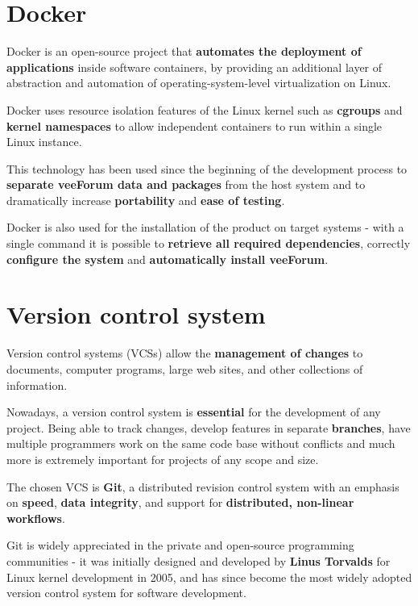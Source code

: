 \documentclass[12pt]{report}
\renewcommand\emph{\textbf}
\begin{document}
            \section{Docker}
                Docker is an open-source project that \emph{automates the deployment of applications} inside software containers, by providing an additional layer of abstraction and automation of operating-system-level virtualization on Linux.

                Docker uses resource isolation features of the Linux kernel such as \emph{cgroups} and \emph{kernel namespaces} to allow independent containers to run within a single Linux instance.

                This technology has been used since the beginning of the development process to \emph{separate veeForum data and packages} from the host system and to dramatically increase \emph{portability} and \emph{ease of testing}.

                Docker is also used for the installation of the product on target systems - with a single command it is possible to \emph{retrieve all required dependencies}, correctly \emph{configure the system} and \emph{automatically install veeForum}.

            \section{Version control system}
                Version control systems (VCSs) allow the \emph{management of changes} to documents, computer programs, large web sites, and other collections of information.

                Nowadays, a version control system is \emph{essential} for the development of any project.
                Being able to track changes, develop features in separate \emph{branches}, have multiple programmers work on the same code base without conflicts and much more is extremely important for projects of any scope and size.

                The chosen VCS is \emph{Git}, a distributed revision control system with an emphasis on \emph{speed}, \emph{data integrity}, and support for \emph{distributed, non-linear workflows}.

                Git is widely appreciated in the private and open-source programming communities - it was initially designed and developed by \emph{Linus Torvalds} for Linux kernel development in 2005, and has since become the most widely adopted version control system for software development.
\end{document}

